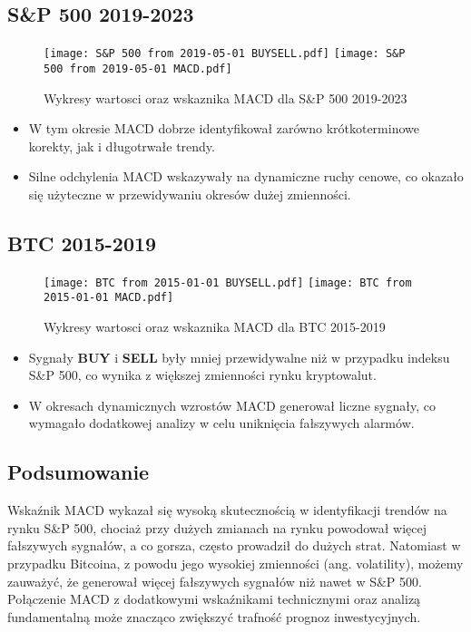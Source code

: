 \documentclass[12pt, letterpaper]{article}
\begin{document}
\subsection{S\&P 500 2019-2023}
\begin{figure}[h!]
    \centering
    \texttt{[image: S\&P 500 from 2019-05-01 BUYSELL.pdf]}
    \texttt{[image: S\&P 500 from 2019-05-01 MACD.pdf]}
    \caption{Wykresy wartosci oraz wskaznika MACD dla S\&P 500 2019-2023} 
    \label{fig:sp500_2019_2023}
\end{figure}

\begin{itemize}
\item W tym okresie MACD dobrze identyfikował zarówno krótkoterminowe korekty, jak i długotrwałe trendy.
\item Silne odchylenia MACD wskazywały na dynamiczne ruchy cenowe, co okazało się użyteczne w przewidywaniu okresów dużej zmienności.
\end{itemize}

\vspace{5cm}  %
\subsection{BTC 2015-2019}

\begin{figure}[h!]
    \centering
    \texttt{[image: BTC from 2015-01-01 BUYSELL.pdf]}
    \texttt{[image: BTC from 2015-01-01 MACD.pdf]}
    \caption{Wykresy wartosci oraz wskaznika MACD dla BTC 2015-2019}
    \label{fig:BTC_2014_2017}
\end{figure}


\begin{itemize}
\item Sygnały \textbf{BUY} i \textbf{SELL} były mniej przewidywalne niż w przypadku indeksu S\&P 500, co wynika z większej zmienności rynku kryptowalut.
\item W okresach dynamicznych wzrostów MACD generował liczne sygnały, co wymagało dodatkowej analizy w celu uniknięcia fałszywych alarmów.
\end{itemize}


\vspace{10cm}  %
\subsection{Podsumowanie}
Wskaźnik MACD wykazał się wysoką skutecznością w identyfikacji trendów na rynku S\&P 500, chociaż przy dużych zmianach na rynku powodował więcej fałszywych sygnałów, a co gorsza, często prowadził do dużych strat. Natomiast w przypadku Bitcoina, z powodu jego wysokiej zmienności (ang. volatility), możemy zauważyć, że generował więcej fałszywych sygnałów niż nawet w S\&P 500. Połączenie MACD z dodatkowymi wskaźnikami technicznymi oraz analizą fundamentalną może znacząco zwiększyć trafność prognoz inwestycyjnych.
\end{document}
